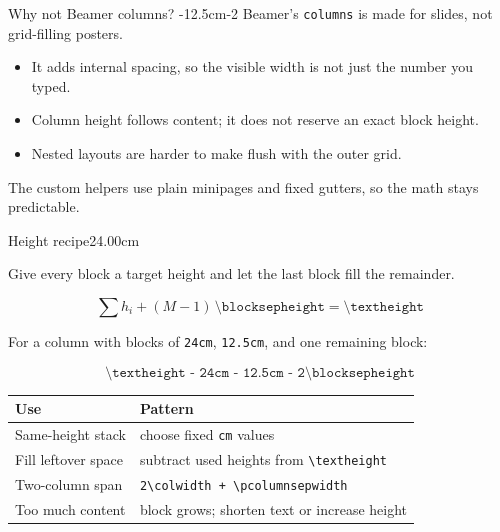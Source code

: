 \documentclass[final]{beamer}
\newlength{\colwidth}
\newlength{\twocolwidth}
\begin{document}
\begin{pframe}
\begin{pcolumn}{\colwidth}
\begin{pblock}[alert]{Why not Beamer columns?}{%
				\textheight-24cm-12.5cm-2\blocksepheight
			}
			Beamer's \texttt{columns} is made for slides, not grid-filling posters.

			\begin{itemize}
				\item It adds internal spacing, so the visible width is not just the number you typed.
				\item Column height follows content; it does not reserve an exact block height.
				\item Nested layouts are harder to make flush with the outer grid.
			\end{itemize}

			The custom helpers use plain minipages and fixed gutters, so the math stays predictable.

		\end{pblock}

	\end{pcolumn}

	\begin{pcolumn}{\twocolwidth}

		\begin{pblock}{Height recipe}{24.00cm}

			Give every block a target height and let the last block fill the remainder.

			\[
				\sum h_i + (M-1)\,\texttt{\textbackslash blocksepheight} = \texttt{\textbackslash textheight}
			\]

			For a column with blocks of \texttt{24cm}, \texttt{12.5cm}, and one remaining block:

			\[
				\texttt{\textbackslash textheight - 24cm - 12.5cm - 2\textbackslash blocksepheight}
			\]

			\begin{table}
				\centering
				\begin{tabular}{l l}
					\toprule
					\textbf{Use} & \textbf{Pattern} \\
					\midrule
					Same-height stack & choose fixed \texttt{cm} values \\
					Fill leftover space & subtract used heights from \texttt{\textbackslash textheight} \\
					Two-column span & \texttt{2\textbackslash colwidth + \textbackslash pcolumnsepwidth} \\
					Too much content & block grows; shorten text or increase height \\
					\bottomrule
				\end{tabular}
			\end{table}


\end{pblock}
\end{pcolumn}
\end{pframe}
\end{document}

